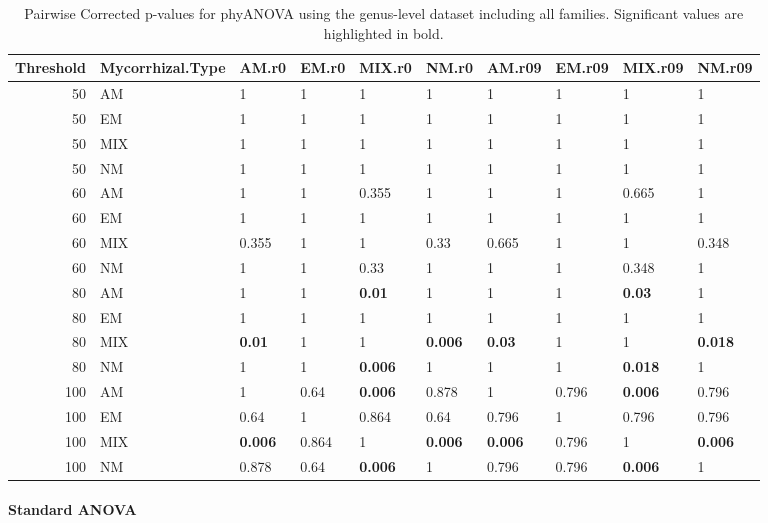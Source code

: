 \documentclass[]{article}
\let\oldparagraph\paragraph
\renewcommand{\paragraph}[1]{\oldparagraph{#1}\mbox{}}
\begin{document}
\begin{table}[H]

\caption{\label{tab:unnamed-chunk-32}Pairwise Corrected p-values for phyANOVA using the genus-level dataset including all families. Significant values are highlighted in bold.}
\centering
\begin{tabular}{r|l|l|l|l|l|l|l|l|l}
\hline
Threshold & Mycorrhizal.Type & AM.r0 & EM.r0 & MIX.r0 & NM.r0 & AM.r09 & EM.r09 & MIX.r09 & NM.r09\\
\hline
50 & AM & 1 & 1 & 1 & 1 & 1 & 1 & 1 & 1\\
\hline
50 & EM & 1 & 1 & 1 & 1 & 1 & 1 & 1 & 1\\
\hline
50 & MIX & 1 & 1 & 1 & 1 & 1 & 1 & 1 & 1\\
\hline
50 & NM & 1 & 1 & 1 & 1 & 1 & 1 & 1 & 1\\
\hline
60 & AM & 1 & 1 & 0.355 & 1 & 1 & 1 & 0.665 & 1\\
\hline
60 & EM & 1 & 1 & 1 & 1 & 1 & 1 & 1 & 1\\
\hline
60 & MIX & 0.355 & 1 & 1 & 0.33 & 0.665 & 1 & 1 & 0.348\\
\hline
60 & NM & 1 & 1 & 0.33 & 1 & 1 & 1 & 0.348 & 1\\
\hline
80 & AM & 1 & 1 & \textbf{0.01} & 1 & 1 & 1 & \textbf{0.03} & 1\\
\hline
80 & EM & 1 & 1 & 1 & 1 & 1 & 1 & 1 & 1\\
\hline
80 & MIX & \textbf{0.01} & 1 & 1 & \textbf{0.006} & \textbf{0.03} & 1 & 1 & \textbf{0.018}\\
\hline
80 & NM & 1 & 1 & \textbf{0.006} & 1 & 1 & 1 & \textbf{0.018} & 1\\
\hline
100 & AM & 1 & 0.64 & \textbf{0.006} & 0.878 & 1 & 0.796 & \textbf{0.006} & 0.796\\
\hline
100 & EM & 0.64 & 1 & 0.864 & 0.64 & 0.796 & 1 & 0.796 & 0.796\\
\hline
100 & MIX & \textbf{0.006} & 0.864 & 1 & \textbf{0.006} & \textbf{0.006} & 0.796 & 1 & \textbf{0.006}\\
\hline
100 & NM & 0.878 & 0.64 & \textbf{0.006} & 1 & 0.796 & 0.796 & \textbf{0.006} & 1\\
\hline
\end{tabular}
\end{table}

\hypertarget{standard-anova-7}{%
\paragraph{Standard ANOVA}\label{standard-anova-7}}
\end{document}
